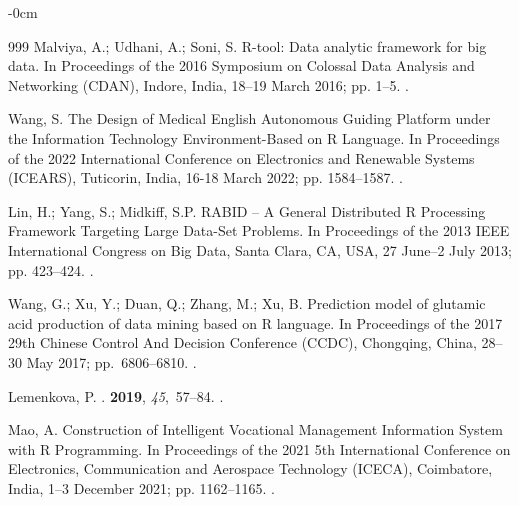 \documentclass[jimaging,article,accept,pdftex,moreauthors]{Definitions/mdpi}
\begin{document}
\begin{adjustwidth}{-\extralength}{0cm}
\begin{thebibliography}{999}
Malviya, A.; Udhani, A.; Soni, S.
\newblock R-tool: Data analytic framework for big data.
\newblock In Proceedings of the 2016 Symposium on Colossal Data Analysis and
  Networking (CDAN),  Indore, India, 18--19 March 2016; pp. 1--5.
.

Wang, S.
\newblock The Design of Medical English Autonomous Guiding Platform under the
  Information Technology Environment-Based on R Language.
\newblock In Proceedings of the 2022 International Conference on Electronics
  and Renewable Systems (ICEARS), Tuticorin, India, 16-18 March 2022; pp. 1584--1587.
. %

Lin, H.; Yang, S.; Midkiff, S.P.
\newblock RABID -- A General Distributed R Processing Framework Targeting Large
  Data-Set Problems.
\newblock In Proceedings of the 2013 IEEE International Congress on Big Data,
 Santa Clara, CA, USA, 27 June--2 July 2013; pp. 423--424.
. %

Wang, G.; Xu, Y.; Duan, Q.; Zhang, M.; Xu, B.
\newblock Prediction model of glutamic acid production of data mining based on
  R language.
\newblock In Proceedings of the 2017 29th Chinese Control And Decision
  Conference (CCDC), Chongqing, China, 28--30 May 2017; pp.~6806--6810.
. %

Lemenkova, P.
.
 {\bf 2019}, {\em 45},~57--84.
.

Mao, A.
\newblock Construction of Intelligent Vocational Management Information System
  with R Programming.
\newblock In Proceedings of the 2021 5th International Conference on
  Electronics, Communication and Aerospace Technology (ICECA), Coimbatore, India, 1--3 December 2021; pp.
  1162--1165.
. %


\end{thebibliography}
\end{adjustwidth}
\end{document}

